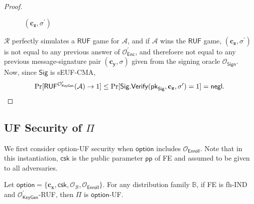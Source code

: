 \begin{proof}
\begin{figure}[h]
\begin{minipage}[t]{0.5\linewidth}
\begin{algorithm}[H]
\begin{algorithmic}[1]
		\State \Return $(\mathbf{c_z}, \sigma^\prime)$
	\end{algorithmic}
	\end{algorithm}
	\end{minipage}
	
\end{figure}

$\mathcal{R}$ perfectly simulates a $\textsf{RUF}$ game for $\mathcal{A}$, and if $\mathcal{A}$ wins the $\textsf{RUF}$ game, $(\mathbf{c_z}, \sigma^\prime)$ is not equal to any previous answer of $\mathcal{O}_{\textsf{Enc}}^\prime$, and therefoere not equal to any previous message-signature pair $(\mathbf{c_y}, \sigma)$ given from the signing oracle $\mathcal{O}_{\textsf{Sign}}$. Now, since $\textsf{Sig}$ is sEUF-CMA,
\[
	\Pr[\textsf{RUF}^{ \mathcal{O}^\prime_{\textsf{KeyGen}}}(\mathcal{A}) \to 1] \leq \Pr[ \textsf{Sig.Verify}(\textsf{pk}_{\textsf{Sig}}, \mathbf{c_z}, \sigma^\prime) = 1 ] = \mathsf{negl}.
\]


\end{proof}



\subsection{UF Security of $\Pi$}
\label{sec:security_analysis:fh-IPFE:uf}

We first consider \textsf{option}-UF security when $\textsf{option}$ includes $\mathcal{O}_\textsf{Enroll}$. Note that in this instantiation, $\textsf{csk}$ is the public parameter $\textsf{pp}$ of \textsf{FE} and assumed to be given to all adversaries. 

\begin{theorem}
\label{thm:fh-IPFE:ind-ruf-OB-Enroll}
	Let $\textsf{option} = \{ \mathbf{c_x}, \textsf{csk}, \mathcal{O}_\mathcal{B}, \mathcal{O}_{\textsf{Enroll}} \}$. For any distribution family $\mathbb{B}$, if \textsf{FE} is fh-IND and $\mathcal{O}^\prime_{\textsf{KeyGen}}$-RUF, then $\Pi$ is $\textsf{option}$-UF. 
\end{theorem}


